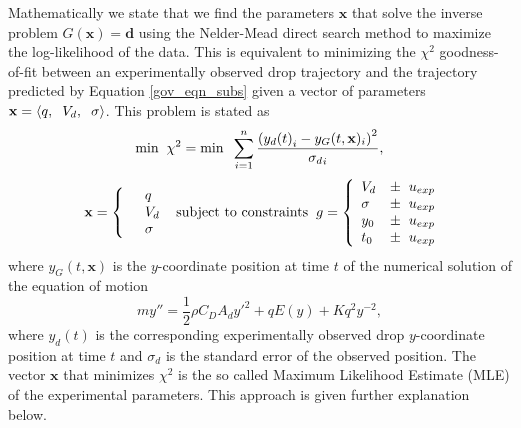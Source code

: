 \documentclass[12pt,a4paper,oneside]{book}
\begin{document}
Mathematically we state that we find the parameters $\mathbf{x}$ that solve the inverse problem $G(\mathbf{x}) = \mathbf{d}$ using the Nelder-Mead direct search method to maximize the log-likelihood of the data. This is equivalent to minimizing the $\chi^2$ goodness-of-fit between an experimentally observed drop trajectory and the trajectory predicted by Equation \ref{gov_eqn_subs} given a vector of parameters $\mathbf{x} = \left\langle q, \hspace{2 mm} V_d, \hspace{2 mm} \sigma \right\rangle$. This problem is stated as  
\[
\mbox{min} \hspace{2 mm} \chi^2 = \mbox{min} \hspace{2 mm} \sum^n_{i=1} \frac{\left({y_d(t)}_i - y_G(t, \mathbf{x})_i \right)^2}{{\sigma_d}_i},
\]
\begin{eqnarray*} \mbox{} \hspace{2 mm} \begin{split} \mathbf{x} = \left\{ \begin{array}{ll}      & q\\
		  &	V_d\\
          & \sigma 
          \end{array} \right. 
          \end{split} \hspace{2 mm} \mbox{subject to constraints} \hspace{2 mm} \begin{split}
          g = \left\{ \begin{array}{ll}
           V_d &\pm \hspace{2 mm} u_{exp}\\
      	   \sigma &\pm  \hspace{2 mm} u_{exp}\\
      	   y_0 &\pm \hspace{2 mm} u_{exp}\\
      	   t_0 &\pm \hspace{2 mm} u_{exp}\\
          \end{array} \right. 
          \end{split}
\end{eqnarray*}
where $y_G(t, \mathbf{x})$ is the $y$-coordinate position at time $t$ of the numerical solution of the equation of motion
\[
m y'' = \frac{1}{2} \rho C_D A_d {y'}^2 + q E(y) + K q^2 y^{-2}, \]
where $y_d(t)$ is the corresponding experimentally observed drop $y$-coordinate position at time $t$ and $\sigma_d$ is the standard error of the observed position. The vector $\mathbf{x}$ that minimizes $\chi^2$ is the so called Maximum Likelihood Estimate (MLE) of the experimental parameters. This approach is given further explanation below.
\end{document}
